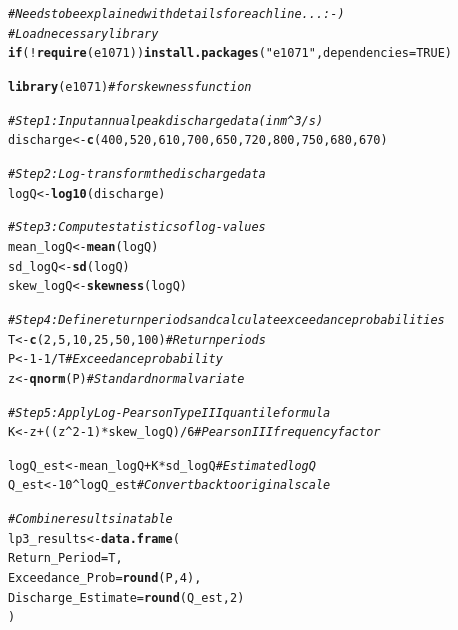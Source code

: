 \documentclass{tufte-handout}\usepackage[]{graphicx}\usepackage[]{xcolor}
\makeatletter
\newcommand{\hlnum}[1]{\textcolor[rgb]{0.686,0.059,0.569}{#1}}%
\newcommand{\hlstr}[1]{\textcolor[rgb]{0.192,0.494,0.8}{#1}}%
\newcommand{\hlcom}[1]{\textcolor[rgb]{0.678,0.584,0.686}{\textit{#1}}}%
\newcommand{\hlopt}[1]{\textcolor[rgb]{0,0,0}{#1}}%
\newcommand{\hlstd}[1]{\textcolor[rgb]{0.345,0.345,0.345}{#1}}%
\newcommand{\hlkwa}[1]{\textcolor[rgb]{0.161,0.373,0.58}{\textbf{#1}}}%
\newcommand{\hlkwb}[1]{\textcolor[rgb]{0.69,0.353,0.396}{#1}}%
\newcommand{\hlkwc}[1]{\textcolor[rgb]{0.333,0.667,0.333}{#1}}%
\newcommand{\hlkwd}[1]{\textcolor[rgb]{0.737,0.353,0.396}{\textbf{#1}}}%
\newenvironment{kframe}{%
 \def\at@end@of@kframe{}%
 \ifinner\ifhmode%
  \def\at@end@of@kframe{\end{minipage}}%
  \begin{minipage}{\columnwidth}%
 \fi\fi%
 \def\FrameCommand##1{\hskip\@totalleftmargin \hskip-\fboxsep
 \colorbox{shadecolor}{##1}\hskip-\fboxsep
     \hskip-\linewidth \hskip-\@totalleftmargin \hskip\columnwidth}%
 \MakeFramed {\advance\hsize-\width
   \@totalleftmargin\z@ \linewidth\hsize
   \@setminipage}}%
 {\par\unskip\endMakeFramed%
 \at@end@of@kframe}
\newenvironment{knitrout}{}{} %
\makeatother
\begin{document}
\begin{knitrout}
\color{fgcolor}\begin{kframe}
\begin{alltt}
\hlcom{# Needs to be explained with details for each line... :-)}
\hlcom{# Load necessary library}
\hlkwa{if} \hlstd{(}\hlopt{!}\hlkwd{require}\hlstd{(e1071))} \hlkwd{install.packages}\hlstd{(}\hlstr{"e1071"}\hlstd{,} \hlkwc{dependencies} \hlstd{=} \hlnum{TRUE}\hlstd{)}
\end{alltt}


{\ttfamily\noindent\itshape\color{messagecolor}{\#\# Loading required package: e1071}}\begin{alltt}
\hlkwd{library}\hlstd{(e1071)}  \hlcom{# for skewness function}

\hlcom{# Step 1: Input annual peak discharge data (in m^3/s)}
\hlstd{discharge} \hlkwb{<-} \hlkwd{c}\hlstd{(}\hlnum{400}\hlstd{,} \hlnum{520}\hlstd{,} \hlnum{610}\hlstd{,} \hlnum{700}\hlstd{,} \hlnum{650}\hlstd{,} \hlnum{720}\hlstd{,} \hlnum{800}\hlstd{,} \hlnum{750}\hlstd{,} \hlnum{680}\hlstd{,} \hlnum{670}\hlstd{)}

\hlcom{# Step 2: Log-transform the discharge data}
\hlstd{logQ} \hlkwb{<-} \hlkwd{log10}\hlstd{(discharge)}

\hlcom{# Step 3: Compute statistics of log-values}
\hlstd{mean_logQ} \hlkwb{<-} \hlkwd{mean}\hlstd{(logQ)}
\hlstd{sd_logQ}   \hlkwb{<-} \hlkwd{sd}\hlstd{(logQ)}
\hlstd{skew_logQ} \hlkwb{<-} \hlkwd{skewness}\hlstd{(logQ)}

\hlcom{# Step 4: Define return periods and calculate exceedance probabilities}
\hlstd{T} \hlkwb{<-} \hlkwd{c}\hlstd{(}\hlnum{2}\hlstd{,} \hlnum{5}\hlstd{,} \hlnum{10}\hlstd{,} \hlnum{25}\hlstd{,} \hlnum{50}\hlstd{,} \hlnum{100}\hlstd{)}              \hlcom{# Return periods}
\hlstd{P} \hlkwb{<-} \hlnum{1} \hlopt{-} \hlnum{1} \hlopt{/} \hlstd{T}                             \hlcom{# Exceedance probability}
\hlstd{z} \hlkwb{<-} \hlkwd{qnorm}\hlstd{(P)}                              \hlcom{# Standard normal variate}

\hlcom{# Step 5: Apply Log-Pearson Type III quantile formula}
\hlstd{K} \hlkwb{<-} \hlstd{z} \hlopt{+} \hlstd{( (z}\hlopt{^}\hlnum{2} \hlopt{-} \hlnum{1}\hlstd{)} \hlopt{*} \hlstd{skew_logQ )} \hlopt{/} \hlnum{6}    \hlcom{# Pearson III frequency factor}

\hlstd{logQ_est} \hlkwb{<-} \hlstd{mean_logQ} \hlopt{+} \hlstd{K} \hlopt{*} \hlstd{sd_logQ}       \hlcom{# Estimated logQ}
\hlstd{Q_est} \hlkwb{<-} \hlnum{10}\hlopt{^}\hlstd{logQ_est}                      \hlcom{# Convert back to original scale}

\hlcom{# Combine results in a table}
\hlstd{lp3_results} \hlkwb{<-} \hlkwd{data.frame}\hlstd{(}
  \hlkwc{Return_Period} \hlstd{= T,}
  \hlkwc{Exceedance_Prob} \hlstd{=} \hlkwd{round}\hlstd{(P,} \hlnum{4}\hlstd{),}
  \hlkwc{Discharge_Estimate} \hlstd{=} \hlkwd{round}\hlstd{(Q_est,} \hlnum{2}\hlstd{)}
\hlstd{)}
\end{alltt}
\end{kframe}
\end{knitrout}
\end{document}

